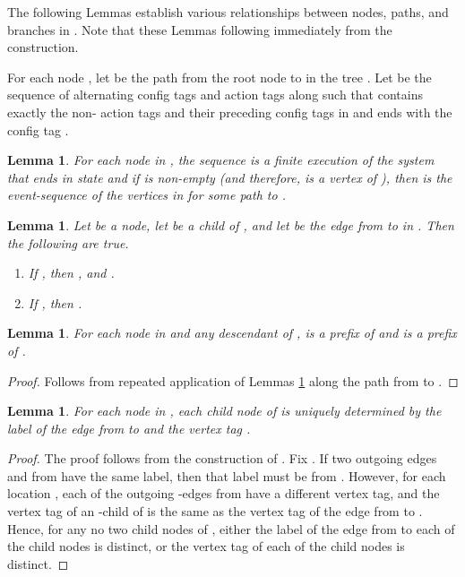 \documentclass[11pt]{article}
\numberwithin{theorem}{section}
\newtheorem{lemma}[theorem]{Lemma}
\begin{document}
The following Lemmas establish various relationships between nodes,
paths, and branches in
. Note that these Lemmas following immediately
from the construction.



 For each node , let  be the path from the root node 
 to  in the tree . 
Let  be the sequence of alternating config tags and action
tags along  such that  contains exactly the
non- action tags and their preceding config tags in  and
ends with the config tag . 



\begin{lemma}\label{prop:nodeFiniteExe}
 For each node  in , the sequence  is a finite execution of the system  that ends in state  and if  is non-empty (and therefore,  is a vertex of ), then  is the event-sequence of the vertices in  for some path to .
\end{lemma}

\begin{lemma}\label{prop:botChild}\label{prop:nonBotChild}
Let  be a node, let  be a child of , and let  be the edge from  to  in . Then the following are true.
 \begin{enumerate}
 \item If , then ,  and .
 \item If , then .
 \end{enumerate}
\end{lemma}

\begin{lemma}\label{prop:ancesterPrefix}\label{prop:ancesterPrefixAFDEvents}
 For each node  in  and any descendant  of ,  is a prefix of  and  is a prefix of .
\end{lemma}
\begin{proof}
 Follows from repeated application of Lemmas \ref{prop:botChild} along the path from  to .
\end{proof}

\begin{lemma}\label{lem:childNodeUniqueByLabelAndVertexTag}
For each node  in , each child node  of  is uniquely determined by the label  of the edge from  to  and the vertex tag .
\end{lemma}
\begin{proof}
The proof follows from the construction of . Fix . If two outgoing edges  and  from  have the same label, then that label must be from . However, for each location , each of the outgoing -edges from  have a different vertex tag, and the vertex tag of an  -child  of  is the same as the vertex tag of the edge from  to . Hence, for any no two child nodes of , either the label of the edge from  to each of the child nodes is distinct, or the vertex tag of each of the child nodes is distinct. 
\end{proof} 
\end{document}
